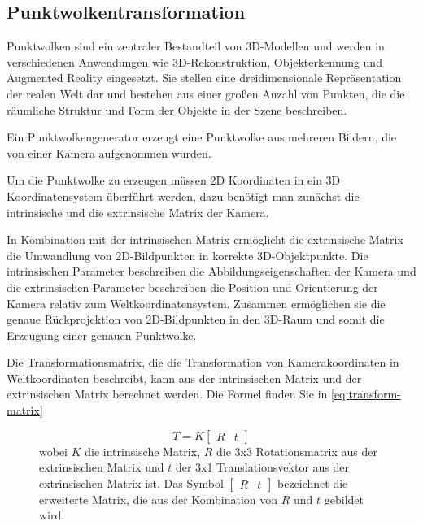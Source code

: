    \cite[vgl.][Kapitel 1.2]{SWB-1681722674} 

\subsection{Punktwolkentransformation}

Punktwolken sind ein zentraler Bestandteil von 3D-Modellen und werden in verschiedenen Anwendungen wie 3D-Rekonstruktion, Objekterkennung und Augmented Reality eingesetzt. Sie stellen eine dreidimensionale Repräsentation der realen Welt dar und bestehen aus einer großen Anzahl von Punkten, die die räumliche Struktur und Form der Objekte in der Szene beschreiben.

Ein Punktwolkengenerator erzeugt eine Punktwolke aus mehreren Bildern, die von einer Kamera aufgenommen wurden.

Um die Punktwolke zu erzeugen müssen 2D Koordinaten in ein 3D Koordinatensystem überführt werden, dazu benötigt man zunächst die intrinsische und die extrinsische Matrix der Kamera. 

In Kombination mit der intrinsischen Matrix ermöglicht die extrinsische Matrix die Umwandlung von 2D-Bildpunkten in korrekte 3D-Objektpunkte. Die intrinsischen Parameter beschreiben die Abbildungseigenschaften der Kamera und die extrinsischen Parameter beschreiben die Position und Orientierung der Kamera relativ zum Weltkoordinatensystem. Zusammen ermöglichen sie die genaue Rückprojektion von 2D-Bildpunkten in den 3D-Raum und somit die Erzeugung einer genauen Punktwolke. 

Die Transformationsmatrix, die die Transformation von Kamerakoordinaten in Weltkoordinaten beschreibt, kann aus der intrinsischen Matrix und der extrinsischen Matrix berechnet werden. Die Formel finden Sie in \ref{eq:transform-matrix}

\cite{SWB-470983582}

\begin{figure}[H]
\begin{equation*}
T = K \begin{bmatrix}R & t\end{bmatrix}
\end{equation*}
wobei $K$ die intrinsische Matrix, $R$ die 3x3 Rotationsmatrix aus der extrinsischen Matrix und $t$ der 3x1 Translationsvektor aus der extrinsischen Matrix ist. Das Symbol $\begin{bmatrix}R & t\end{bmatrix}$ bezeichnet die erweiterte Matrix, die aus der Kombination von $R$ und $t$ gebildet wird.
\end{figure}

